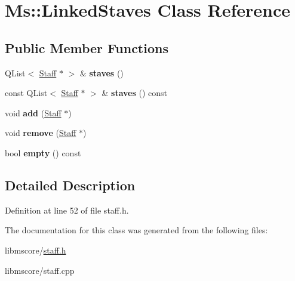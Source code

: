 \hypertarget{class_ms_1_1_linked_staves}{}\section{Ms\+:\+:Linked\+Staves Class Reference}
\label{class_ms_1_1_linked_staves}
\subsection*{Public Member Functions}
\begin{DoxyCompactItemize}
\item 
\mbox{\label{class_ms_1_1_linked_staves_a888f1de6dfec1a14fb894d261780a922}} 
Q\+List$<$ \hyperlink{class_ms_1_1_staff}{Staff} $\ast$ $>$ \& {\bfseries staves} ()
\item 
\mbox{\label{class_ms_1_1_linked_staves_aced37fd3a4e309387fa4a07ea1240642}} 
const Q\+List$<$ \hyperlink{class_ms_1_1_staff}{Staff} $\ast$ $>$ \& {\bfseries staves} () const
\item 
\mbox{\label{class_ms_1_1_linked_staves_acfd4c2492583387683f638732d639dab}} 
void {\bfseries add} (\hyperlink{class_ms_1_1_staff}{Staff} $\ast$)
\item 
\mbox{\label{class_ms_1_1_linked_staves_ab42ef70d6af3abc7e8569c681ff0f2e7}} 
void {\bfseries remove} (\hyperlink{class_ms_1_1_staff}{Staff} $\ast$)
\item 
\mbox{\label{class_ms_1_1_linked_staves_ad4a9232d1ee961081a379d9bc477cc61}} 
bool {\bfseries empty} () const
\end{DoxyCompactItemize}


\subsection{Detailed Description}


Definition at line 52 of file staff.\+h.



The documentation for this class was generated from the following files\+:\begin{DoxyCompactItemize}
\item 
libmscore/\hyperlink{staff_8h}{staff.\+h}\item 
libmscore/staff.\+cpp\end{DoxyCompactItemize}

